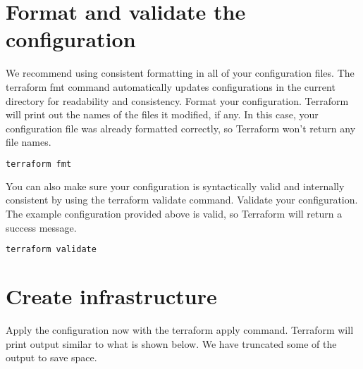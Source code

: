 \documentclass[../main.tex]{subfiles}
\begin{document}
\section{Format and validate the configuration}
We recommend using consistent formatting in all of your configuration files. The terraform fmt command automatically updates configurations in the current directory for readability and consistency.
Format your configuration. Terraform will print out the names of the files it modified, if any. In this case, your configuration file was already formatted correctly, so Terraform won't return any file names.
\begin{lstlisting}[language=bash]
  terraform fmt
\end{lstlisting}
You can also make sure your configuration is syntactically valid and internally consistent by using the terraform validate command.
Validate your configuration. The example configuration provided above is valid, so Terraform will return a success message.
\begin{lstlisting}[language=bash]
  terraform validate
\end{lstlisting}

\section{Create infrastructure}
Apply the configuration now with the terraform apply command.
Terraform will print output similar to what is shown below. 
We have truncated some of the output to save space.
\end{document}
